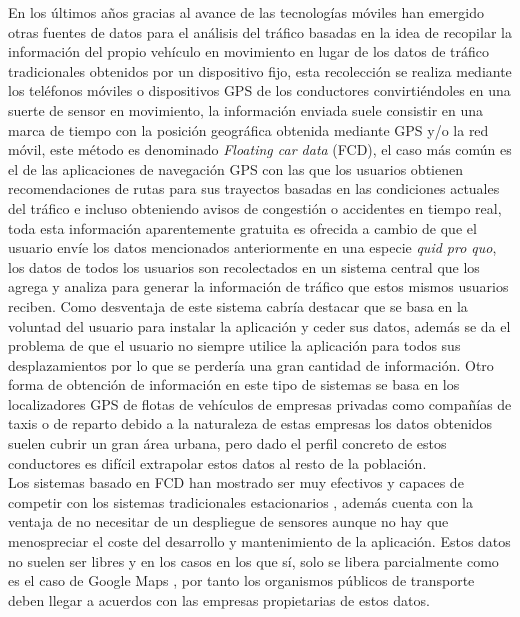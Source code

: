 \documentclass[../proyecto.tex]{subfiles}
\begin{document}
En los últimos años gracias al avance de las tecnologías móviles han emergido otras fuentes de datos para el análisis del tráfico basadas en la idea de recopilar la información del propio vehículo en movimiento en lugar de los datos de tráfico tradicionales obtenidos por un dispositivo fijo, esta recolección se realiza mediante los teléfonos móviles o dispositivos GPS de los conductores convirtiéndoles en una suerte de sensor en movimiento, la información enviada suele consistir en una marca de tiempo con la posición geográfica obtenida mediante GPS y/o la red móvil, este método es denominado \textit{Floating car data} (FCD), el caso más común es el de las aplicaciones de navegación GPS con las que los usuarios obtienen recomendaciones de rutas para sus trayectos basadas en las condiciones actuales del tráfico e incluso obteniendo avisos de congestión o accidentes en tiempo real, toda esta información aparentemente gratuita es ofrecida a cambio de que el usuario envíe los datos mencionados anteriormente en una especie \textit{quid pro quo}, los datos de todos los usuarios son recolectados en un sistema central que los agrega y analiza para generar la información de tráfico que estos mismos usuarios reciben. Como desventaja de este sistema cabría destacar que se basa en la voluntad del usuario para instalar la aplicación y ceder sus datos, además se da el problema de que el usuario no siempre utilice la aplicación para todos sus desplazamientos por lo que se perdería una gran cantidad de información. Otro forma de obtención de información en este tipo de sistemas se basa en los localizadores GPS de flotas de vehículos de empresas privadas como compañías de taxis o de reparto \cite{HUANG2018318} debido a la naturaleza de estas empresas los datos obtenidos suelen cubrir un gran área urbana, pero dado el perfil concreto de estos conductores es difícil extrapolar estos datos al resto de la población.\\

Los sistemas basado en FCD han mostrado ser muy efectivos y capaces de competir con los sistemas tradicionales estacionarios \cite{KESSLER2018299} \cite{NARANJO2010}  \cite{KESSLER2018299} \cite{GUILLAUME2008}, además cuenta con la ventaja de no necesitar de un despliegue de sensores aunque no hay que menospreciar el coste del desarrollo y mantenimiento de la aplicación. Estos datos no suelen ser libres y en los casos en los que sí, solo se libera parcialmente como es el caso de Google Maps \cite{LI20194}, por tanto los organismos públicos de transporte deben llegar a acuerdos con las empresas propietarias de estos datos.\\
\end{document}
